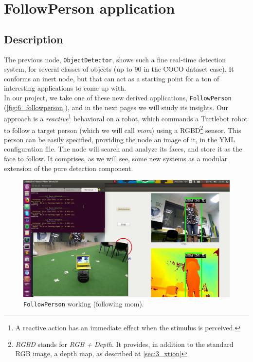 \chapter{FollowPerson application}
\label{chap:followperson}
\section{Description}
	The previous node, \texttt{ObjectDetector}, shows such a fine real-time detection system, for several classes of objects (up to 90 in the COCO dataset case). It conforms an inert node, but that can act as a starting point for a ton of interesting applications to come up with.\\
	
	In our project, we take one of these new derived applications, \texttt{FollowPerson} (\autoref{fig:6_followperson}), and in the next pages we will study its insights. Our approach is a \emph{reactive}\footnote{A reactive action has an immediate effect when the stimulus is perceived.} behavioral on a robot, which commands a Turtlebot robot to follow a target person (which we will call \emph{mom}) using a RGBD\footnote{\emph{RGBD} stands for \emph{RGB + Depth}. It provides, in addition to the standard RGB image, a depth map, as described at \ref{sec:3_xtion}} sensor. This person can be easily specified, providing the node an image of it, in the YML configuration file. The node will search and analyze its faces, and store it as the face to follow. It comprises, as we will see, some new systems as a modular extension of the pure detection component.
	
	\begin{figure}[h]
		\centering
		\includegraphics[width=6in]{images/followperson_working}
		\caption{\texttt{FollowPerson} working (following mom).}
		\label{fig:6_followperson}
	\end{figure}
	
